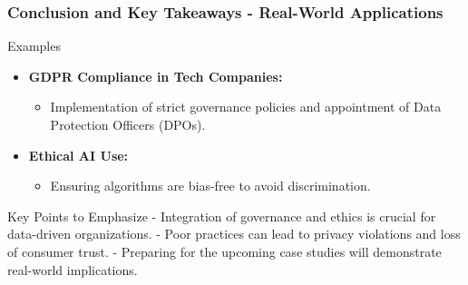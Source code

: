 \documentclass{beamer}
\begin{document}
\begin{frame}[fragile]
    \frametitle{Conclusion and Key Takeaways - Real-World Applications}

    \begin{block}{Examples}
        \begin{itemize}
            \item \textbf{GDPR Compliance in Tech Companies:} 
                \begin{itemize}
                    \item Implementation of strict governance policies and appointment of Data Protection Officers (DPOs).
                \end{itemize}
            \item \textbf{Ethical AI Use:}
                \begin{itemize}
                    \item Ensuring algorithms are bias-free to avoid discrimination.
                \end{itemize}
        \end{itemize}
    \end{block}
    
    \begin{block}{Key Points to Emphasize}
        - Integration of governance and ethics is crucial for data-driven organizations.
        - Poor practices can lead to privacy violations and loss of consumer trust.
        - Preparing for the upcoming case studies will demonstrate real-world implications.
    \end{block}
\end{frame}
\end{document}
